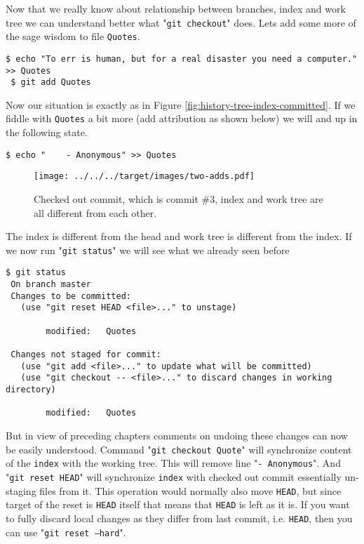 \documentclass{article}
\theoremstyle{definition}
\begin{document}
        Now that we really know about relationship between branches, index and work tree we can understand better
        what "\texttt{git checkout}" does. Lets add some more of the sage wisdom to file \texttt{Quotes}.
        \begin{Verbatim}[frame=single]
 $ echo "To err is human, but for a real disaster you need a computer." >> Quotes
 $ git add Quotes
        \end{Verbatim}
        Now our situation is exactly as in Figure \ref{fig:history-tree-index-committed}. If we fiddle
        with \texttt{Quotes} a bit more (add attribution as shown below) we will and up in the following state.
        \begin{Verbatim}[frame=single]
 $ echo "    - Anonymous" >> Quotes
        \end{Verbatim}

        \begin{figure}[h]
        \texttt{[image: ../../../target/images/two-adds.pdf]}
        \caption{Checked out commit, which is commit \#3, index and work tree are all different from each other.\label{fig:two-adds}}
        \end{figure}

        \noindent The index is different from the head and work tree is different from the index. If we now run "\texttt{git status}" we will see what we already seen before

        \begin{Verbatim}[frame=single]
 $ git status
 On branch master
 Changes to be committed:
   (use "git reset HEAD <file>..." to unstage)

        modified:   Quotes

 Changes not staged for commit:
   (use "git add <file>..." to update what will be committed)
   (use "git checkout -- <file>..." to discard changes in working directory)

        modified:   Quotes
        \end{Verbatim}
        But in view of preceding chapters comments on undoing these changes can now be easily understood. Command
        "\texttt{git checkout Quote}" will synchronize content of the \texttt{index} with the working tree. This will
        remove line "\texttt{- Anonymous}". And "\texttt{git reset HEAD}" will synchronize \texttt{index} with checked
        out commit essentially un-staging files from it. This operation would normally also move \texttt{HEAD}, but
        since target of the reset is \texttt{HEAD} itself that means that \texttt{HEAD} is left as it is. If you want
        to fully discard local changes as they differ from last commit, i.e. \texttt{HEAD}, then you can
        use "\texttt{git reset --hard}".
\end{document}
